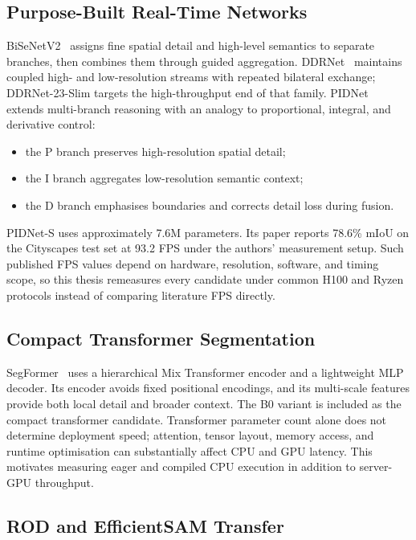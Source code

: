 \documentclass[12pt,a4paper]{report}
\begin{document}
\subsection{Purpose-Built Real-Time Networks}

BiSeNetV2~\cite{yu2021bisenetv2} assigns fine spatial detail and high-level
semantics to separate branches, then combines them through guided aggregation.
DDRNet~\cite{hong2022ddrnet} maintains coupled high- and low-resolution streams
with repeated bilateral exchange; DDRNet-23-Slim targets the high-throughput
end of that family. PIDNet~\cite{xu2023pidnet} extends multi-branch reasoning
with an analogy to proportional, integral, and derivative control:
\begin{itemize}[nosep]
  \item the P branch preserves high-resolution spatial detail;
  \item the I branch aggregates low-resolution semantic context;
  \item the D branch emphasises boundaries and corrects detail loss during fusion.
\end{itemize}
PIDNet-S uses approximately 7.6M parameters. Its paper reports 78.6\% mIoU on
the Cityscapes test set at 93.2 FPS under the authors' measurement setup. Such
published FPS values depend on hardware, resolution, software, and timing
scope, so this thesis remeasures every candidate under common H100 and Ryzen
protocols instead of comparing literature FPS directly.

\subsection{Compact Transformer Segmentation}

SegFormer~\cite{xie2021segformer} uses a hierarchical Mix Transformer encoder
and a lightweight MLP decoder. Its encoder avoids fixed positional encodings,
and its multi-scale features provide both local detail and broader context.
The B0 variant is included as the compact transformer candidate. Transformer
parameter count alone does not determine deployment speed; attention, tensor
layout, memory access, and runtime optimisation can substantially affect CPU
and GPU latency. This motivates measuring eager and compiled CPU execution in
addition to server-GPU throughput.

\subsection{ROD and EfficientSAM Transfer}
\end{document}
